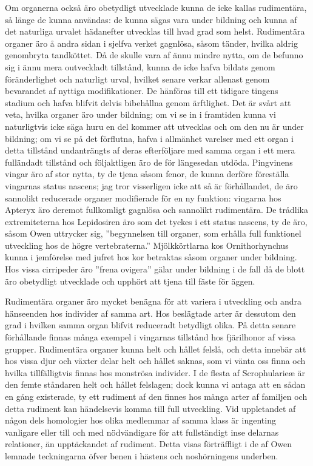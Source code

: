 Om organerna också äro obetydligt utvecklade kunna de icke kallas rudimentära, så länge de kunna användas: de kunna sägas vara under bildning och kunna af det naturliga urvalet hädanefter utvecklas till hvad grad som helst. Rudimentära organer äro å andra sidan i sjelfva verket gagnlösa, såsom tänder, hvilka aldrig genombryta tandköttet. Då de skulle vara af ännu mindre nytta, om de befunno sig i ännu mera outveckladt tillstånd, kunna de icke hafva bildats genom föränderlighet och naturligt urval, hvilket senare verkar allenast genom bevarandet af nyttiga modifikationer. De hänföras till ett tidigare tingens stadium och hafva blifvit delvis bibehållna genom ärftlighet. Det är svårt att veta, hvilka organer äro under bildning; om vi se in i framtiden kunna vi naturligtvis icke säga huru en del kommer att utvecklas och om den nu är under bildning; om vi se på det förflutna, hafva i allmänhet varelser med ett organ i detta tillstånd undanträngts af deras efterföljare med samma organ i ett mera fulländadt tillstånd och följaktligen äro de för längesedan utdöda. Pingvinens vingar äro af stor nytta, ty de tjena såsom fenor, de kunna derföre föreställa vingarnas status nascens; jag tror visserligen icke att så är förhållandet, de äro sannolikt reducerade organer modifierade för en ny funktion: vingarna hos Apteryx äro deremot fullkomligt gagnlösa och sannolikt rudimentära. De trådlika extremiteterna hos Lepidosiren äro som det tyckes i ett status nascens, ty de äro, såsom Owen uttrycker sig, ”begynnelsen till organer, som erhålla full funktionel utveckling hos de högre vertebraterna.” Mjölkkörtlarna kos Ornithorhynchus kunna i jemförelse med jufret hos kor betraktas såsom organer under bildning. Hos vissa cirripeder äro ”frena ovigera” gälar under bildning i de fall då de blott äro obetydligt utvecklade och upphört att tjena till fäste för äggen.

Rudimentära organer äro mycket benägna för att variera i utveckling och andra hänseenden hos individer af samma art. Hos beslägtade arter är dessutom den grad i hvilken samma organ blifvit reduceradt betydligt olika. På detta senare förhållande finnas många exempel i vingarnas tillstånd hos fjärilhonor af vissa grupper. Rudimentära organer kunna helt och hållet felslå, och detta innebär att hos vissa djur och växter delar helt och hållet saknas, som vi vänta oss finna och hvilka tillfälligtvis finnas hos monströsa individer. I de flesta af Scrophularieæ är den femte ståndaren helt och hållet felslagen; dock kunna vi antaga att en sådan en gång existerade, ty ett rudiment af den finnes hos många arter af familjen och detta rudiment kan händelsevis komma till full utveckling. Vid uppletandet af någon dels homologier hos olika medlemmar af samma klass är ingenting vanligare eller till och med nödvändigare för att fullständigt inse delarnas relationer, än upptäckandet af rudiment. Detta visas förträffligt i de af Owen lemnade teckningarna öfver benen i hästens och noshörningens underben.

